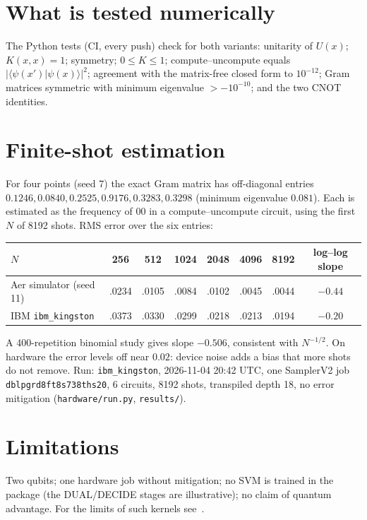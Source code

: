 \documentclass[11pt]{article}
\begin{document}
\section{What is tested numerically}
The Python tests (CI, every push) check for both variants: unitarity of $U(x)$; $K(x,x)=1$; symmetry; $0\le K\le1$;
compute--uncompute equals $|\langle\psi(x')|\psi(x)\rangle|^2$; agreement with the matrix-free closed form to $10^{-12}$;
Gram matrices symmetric with minimum eigenvalue $>-10^{-10}$; and the two CNOT identities.

\section{Finite-shot estimation}\label{sec:shots}
For four points (seed 7) the exact Gram matrix has off-diagonal entries $0.1246, 0.0840, 0.2525, 0.9176, 0.3283, 0.3298$ (minimum eigenvalue $0.081$).
Each is estimated as the frequency of $00$ in a compute--uncompute circuit, using the first $N$ of 8192 shots. RMS error over the six entries:
\begin{center}\begin{tabular}{lccccccc}
$N$ & 256 & 512 & 1024 & 2048 & 4096 & 8192 & log--log slope\\\hline
Aer simulator (seed 11) & .0234 & .0105 & .0084 & .0102 & .0045 & .0044 & $-0.44$\\
IBM \texttt{ibm\_kingston} & .0373 & .0330 & .0299 & .0218 & .0213 & .0194 & $-0.20$
\end{tabular}\end{center}
A 400-repetition binomial study gives slope $-0.506$, consistent with $N^{-1/2}$. On hardware the error levels off near $0.02$:
device noise adds a bias that more shots do not remove. Run: \texttt{ibm\_kingston}, 2026-11-04 20:42 UTC, one SamplerV2 job
\texttt{dblpgrd8ft8s738ths20}, 6 circuits, 8192 shots, transpiled depth 18, no error mitigation (\texttt{hardware/run.py}, \texttt{results/}).

\section{Limitations}
Two qubits; one hardware job without mitigation; no SVM is trained in the package (the DUAL/DECIDE stages are illustrative);
no claim of quantum advantage. For the limits of such kernels see~\cite{kubler}.
\end{document}
